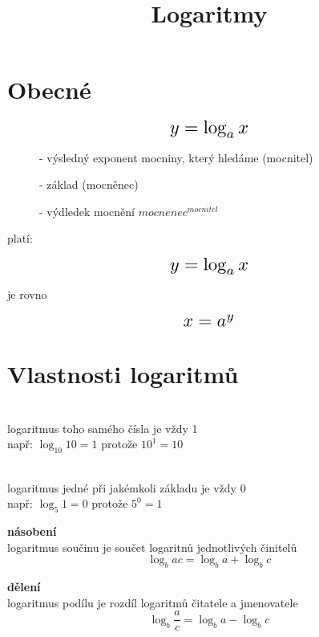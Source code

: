 \documentclass[a4paper,11pt]{article}
\title{Logaritmy}
\begin{document}
\maketitle

\section{Obecné}
\begin{equation*}
    \scalebox{1.6}{$
        y = \log_{a} x
    $}
\end{equation*}
\begin{description}
    \item[] - výsledný exponent mocniny, který hledáme (mocnitel)
    \item[] - základ (mocněnec)
    \item[] - výdledek mocnění $mocnenec^{mocnitel}$
\end{description}

platí:

\begin{equation*}
    \scalebox{1.6}{$y = \log_{a} x$}
\end{equation*}
\begin{center}
    je rovno
\end{center}
\begin{equation*}
    \scalebox{1.6}{$x = a^y$}
\end{equation*}

\section{Vlastnosti logaritmů}
\begin{description}
    \item{}\\
        logaritmus toho samého čísla je vždy 1\\
        např: $\log_{10} 10 = 1$ protože $10^1 = 10$
    \item{}\\
        logaritmus jedné při jakémkoli základu je vždy 0\\
        např: $\log_5 1 = 0$ protože $5^0 = 1$
    \item{\textbf{násobení}}\\
        logaritmus součinu je součet logaritnů jednotlivých činitelů
        \begin{equation*}
            \log_b ac = \log_b a + \log_b c
        \end{equation*}
    \item{\textbf{dělení}}\\
        logaritmus podílu je rozdíl logaritmů čitatele a jmenovatele
        \begin{equation*}
            \log_b \frac a c = \log_b a - \log_b c
        \end{equation*}
\end{description}
\end{document}

